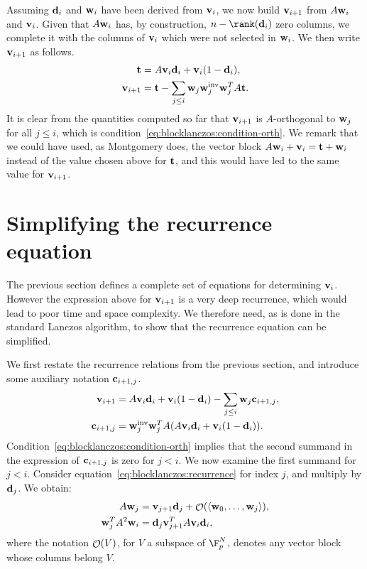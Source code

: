 Assuming $\mathbf{d}_i$ and $\mathbf{w}_i$ have been derived from
$\mathbf{v}_i$, we now build $\mathbf{v}_{i+1}$ from $A\mathbf{w}_i$ and $\mathbf{v}_i$. Given that
$A\mathbf{w}_i$ has, by construction, $n-\rank(\bfd_i)$ zero columns, we
complete it with the columns of $\mathbf{v}_i$ which were not selected in
$\mathbf{w}_i$. We then write $\mathbf{v}_{i+1}$
as follows.
\begin{align*}
    \mathbf{t} &= A\mathbf{v}_i\mathbf{d}_i + \mathbf{v}_i(1-\mathbf{d}_i),\\
    \mathbf{v}_{i+1} &= \mathbf{t} - \sum_{j\leq i} \mathbf{w}_j\mathbf{w}_j^{\text{inv}}\mathbf{w}_j^TA\mathbf{t}.
\end{align*}
It is clear from the quantities computed so far that $\mathbf{v}_{i+1}$ is
$A$-orthogonal to $\mathbf{w}_j$ for all $j\leq i$, which is
condition~\eqref{eq:blocklanczos:condition-orth}.  We remark that we
could have used, as Montgomery does, the vector block
$A\mathbf{w}_i+\mathbf{v}_i=\mathbf{t}+\mathbf{w}_i$ instead of the value chosen above for
$\mathbf{t}$, and this would have led to the same value for
$\mathbf{v}_{i+1}$.


\section{Simplifying the recurrence equation}

The previous section defines a complete set of equations for determining
$\mathbf{v}_i$.  However the expression above for $\mathbf{v}_{i+1}$ is a very deep
recurrence, which would lead to poor time and space complexity. We
therefore need, as is done in the standard
Lanczos algorithm, to show that the recurrence equation can be
simplified.

We first restate the recurrence relations from the previous section, and
introduce some auxiliary notation $\mathbf{c}_{i+1,j}$.
\begin{align}
    \label{eq:blocklanczos:recurrence}
    \mathbf{v}_{i+1} &= A\mathbf{v}_i\mathbf{d}_i + \mathbf{v}_i(1-\mathbf{d}_i) - \sum_{j\leq i}
    \mathbf{w}_j
    \mathbf{c}_{i+1,j},\\
    \notag
    \mathbf{c}_{i+1,j}&=
    \mathbf{w}_j^{\text{inv}} \mathbf{w}_j^TA(A\mathbf{v}_i\mathbf{d}_i + \mathbf{v}_i(1-\mathbf{d}_i)).
\end{align}
Condition~\eqref{eq:blocklanczos:condition-orth} implies that the
second summand in the expression of $\mathbf{c}_{i+1,j}$ is zero for $j<i$.
We now examine
the first summand for $j<i$.
Consider equation~\eqref{eq:blocklanczos:recurrence} for index $j$, and
multiply by $\mathbf{d}_j$. We obtain:
\begin{align*}
    A\mathbf{w}_j&=\mathbf{v}_{j+1}\mathbf{d}_j+\mathop{\mathcal{O}}(\langle\mathbf{w}_0,\ldots,\mathbf{w}_j\rangle),\\
    \mathbf{w}_j^TA^2\mathbf{w}_i &=\mathbf{d}_j\mathbf{v}_{j+1}^TA\mathbf{v}_i\mathbf{d}_i,
\end{align*}
where the notation $\mathop{\mathcal{O}}(V)$, for $V$ a
subspace of $\F_p^N$, denotes any vector
block whose columns belong $V$.

